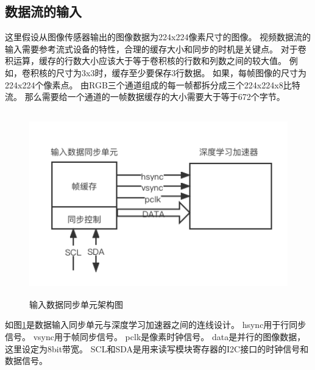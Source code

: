 \subsection{数据流的输入}

这里假设从图像传感器输出的图像数据为224x224像素尺寸的图像。
视频数据流的输入需要参考流式设备的特性，合理的缓存大小和同步的时机是关键点。
对于卷积运算，缓存的行数大小应该大于等于卷积核的行数和列数之间的较大值。
例如，卷积核的尺寸为3x3时，缓存至少要保存3行数据。
如果，每帧图像的尺寸为224x224个像素点。
由RGB三个通道组成的每一帧都拆分成三个224x224x8比特流。
那么需要给一个通道的一帧数据缓存的大小需要大于等于672个字节。







\begin{figure}[htbp]
    \centering
    \includegraphics[width=12cm,height=8cm]{figures/input_data_adapter.png}
    \caption{输入数据同步单元架构图}
    \label{fig:input_data_adapter}
\end{figure}

如图\ref{fig:input_data_adapter}是数据输入同步单元与深度学习加速器之间的连线设计。
hsync用于行同步信号。
vsync用于帧同步信号。
pclk是像素时钟信号。
data是并行的图像数据，这里设定为8bit带宽。
SCL和SDA是用来读写模块寄存器的I2C接口的时钟信号和数据信号。


